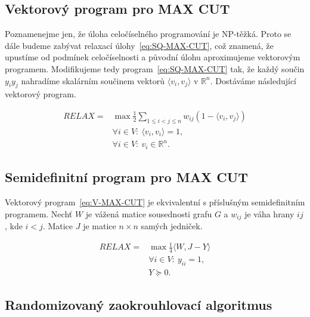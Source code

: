 \subsection*{Vektorový program pro MAX CUT}

Poznamenejme jen, že úloha celočíselného programování je NP-těžká. Proto se dále budeme zabývat relaxací úlohy~\ref{eq:SQ-MAX-CUT}, což znamená, že upustíme od podmínek celočíselnosti a původní úlohu aproximujeme vektorovým programem. Modifikujeme tedy program~\ref{eq:SQ-MAX-CUT} tak, že každý součin $y_i y_j$ nahradíme skalárním součinem vektorů $\langle v_i, v_j \rangle$ v $\mathbb{R}^n$. Dostáváme následující vektorový program.

\begin{equation}\tag{V-MAX-CUT}
    \begin{split}
        RELAX = &\max \frac{1}{2} \sum_{1 \leq i < j \leq n} w_{ij} (1 - \langle v_i, v_j \rangle) \\
        &\forall i \in V:\ \langle v_i, v_i \rangle = 1, \\
        &\forall i \in V:\ v_i \in \mathbb{R}^n.
    \end{split}
    \label{eq:V-MAX-CUT}
\end{equation}


\subsection*{Semidefinitní program pro MAX CUT}

Vektorový program~\ref{eq:V-MAX-CUT} je ekvivalentní s příslušným semidefinitním programem. Nechť $W$ je vážená matice sousednosti grafu $G$ a $w_{ij}$ je váha hrany $ij$, kde $i < j$. Matice $J$ je matice $n \times n$ samých jedniček.

\begin{equation}\tag{SDP-MAX-CUT}
    \begin{split}
        RELAX = &\max \frac{1}{4} \langle W, J - Y \rangle \\
        &\forall i \in V:\ y_{ii} = 1, \\
        &Y \succeq 0.
    \end{split}
    \label{eq:SDP-MAX-CUT}
\end{equation}

\subsection*{Randomizovaný zaokrouhlovací algoritmus}

